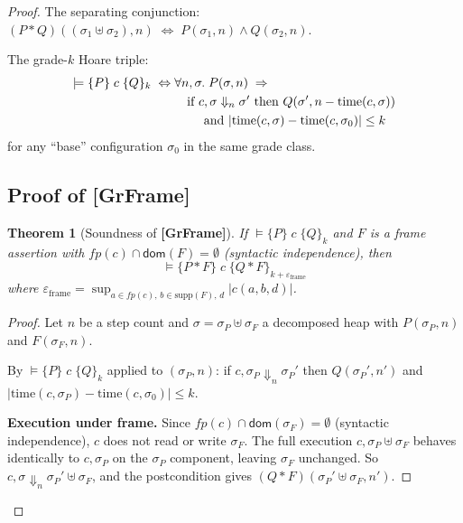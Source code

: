 \documentclass[acmsmall,sigplan,anonymous,review,screen]{acmart}
\theoremstyle{plain}
\newtheorem{theorem}{Theorem}[section]
\theoremstyle{definition}
\newcommand{\fp}{\mathit{fp}}
\newcommand{\sep}{*}
\newcommand{\defect}{\varepsilon}
\begin{document}
\begin{proof}
The separating conjunction:
$(P \sep Q)((\sigma_1 \uplus \sigma_2), n) \;\Leftrightarrow\;
  P(\sigma_1, n) \wedge Q(\sigma_2, n)$.

The grade-$k$ Hoare triple:
\begin{align}
  \models \{P\}\; c\; \{Q\}_k \;\Leftrightarrow\;
  &\forall n, \sigma.\; P(\sigma, n) \;\Rightarrow\; \notag \\
  &\quad \text{if } c,\sigma \Downarrow_n \sigma'
     \text{ then } Q(\sigma', n - \mathrm{time}(c, \sigma)) \notag \\
  &\quad\quad \text{ and } |\mathrm{time}(c, \sigma) - \mathrm{time}(c, \sigma_0)| \leq k \label{eq:semtriple}
\end{align}
for any ``base'' configuration $\sigma_0$ in the same grade class.

\subsection{Proof of \textbf{[GrFrame]}}

\begin{theorem}[Soundness of \textbf{[GrFrame]}]
  If $\models \{P\}\; c\; \{Q\}_k$ and $F$ is a frame assertion with
  $\fp(c) \cap \mathsf{dom}(F) = \emptyset$ (syntactic independence), then
  \[
    \models \{P \sep F\}\; c\; \{Q \sep F\}_{k + \defect_{\mathrm{frame}}}
  \]
  where $\defect_{\mathrm{frame}} = \sup_{a \in \fp(c),\, b \in \mathrm{supp}(F),\, d} |c(a, b, d)|$.
\end{theorem}

\begin{proof}
  Let $n$ be a step count and $\sigma = \sigma_P \uplus \sigma_F$ a
  decomposed heap with $P(\sigma_P, n)$ and $F(\sigma_F, n)$.

  By $\models \{P\}\; c\; \{Q\}_k$ applied to $(\sigma_P, n)$:
  if $c, \sigma_P \Downarrow_n \sigma_P'$ then $Q(\sigma_P', n')$ and
  $|\mathrm{time}(c, \sigma_P) - \mathrm{time}(c, \sigma_0)| \leq k$.

  \medskip
  \textbf{Execution under frame.}
  Since $\fp(c) \cap \mathsf{dom}(\sigma_F) = \emptyset$ (syntactic independence),
  $c$ does not read or write $\sigma_F$.  The full execution $c, \sigma_P \uplus \sigma_F$
  behaves identically to $c, \sigma_P$ on the $\sigma_P$ component, leaving
  $\sigma_F$ unchanged.  So $c, \sigma \Downarrow_n \sigma_P' \uplus \sigma_F$,
  and the postcondition gives $(Q \sep F)(\sigma_P' \uplus \sigma_F, n')$.


\end{proof}
\end{proof}
\end{document}
